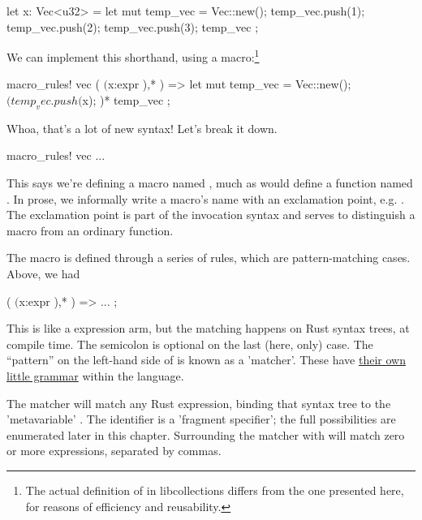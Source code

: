 \begin{rustc}
let x: Vec<u32> = {
    let mut temp_vec = Vec::new();
    temp_vec.push(1);
    temp_vec.push(2);
    temp_vec.push(3);
    temp_vec
};
\end{rustc}

We can implement this shorthand, using a macro:\footnote{The actual definition of  in libcollections differs from the one 
presented here, for reasons of efficiency and reusability.}

\begin{rustc}
macro_rules! vec {
    ( $( $x:expr ),* ) => {
        {
            let mut temp_vec = Vec::new();
            $(
                temp_vec.push($x);
            )*
            temp_vec
        }
    };
}
\end{rustc}

Whoa, that's a lot of new syntax! Let's break it down.

\begin{rustc}
macro_rules! vec { ... }
\end{rustc}

This says we're defining a macro named , much as  would define a function named . In prose, we informally 
write a macro's name with an exclamation point, e.g. . The exclamation point is part of the invocation syntax and serves to 
distinguish a macro from an ordinary function.


The macro is defined through a series of rules, which are pattern-matching cases. Above, we had

\begin{rustc}
( $( $x:expr ),* ) => { ... };
\end{rustc}

This is like a  expression arm, but the matching happens on Rust syntax trees, at compile time. The semicolon is optional
on the last (here, only) case. The \enquote{pattern} on the left-hand side of \code{=>} is known as a 'matcher'. These have 
\href{https://doc.rust-lang.org/reference.html#macros}{their own little grammar} within the language.

\blank

The matcher  will match any Rust expression, binding that syntax tree to the 'metavariable' . The identifier 
 is a 'fragment specifier'; the full possibilities are enumerated later in this chapter. Surrounding the matcher with 
 will match zero or more expressions, separated by commas.

